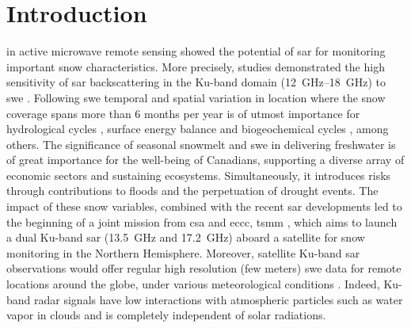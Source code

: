 \section{Introduction}

 in active microwave remote sensing showed the potential of \ac{sar} for monitoring important snow characteristics.
More precisely, studies demonstrated the high sensitivity of \ac{sar} backscattering in the Ku-band domain (\qtyrange{12}{18}{\giga\hertz}) to \acf{swe} \parencite{Shi2016,King2018,Rutter2019}.
Following \ac{swe} temporal and spatial variation in location where the snow coverage spans more than 6 months per year is of utmost importance for hydrological cycles \parencite{Zhang2005,Ayguen2020}, surface energy balance \parencite{Cohen2001,Box2019} and biogeochemical cycles \parencite{Zhang2005,Grogan2006}, among others.
The significance of seasonal snowmelt and \ac{swe} in delivering freshwater is of great importance for the well-being of Canadians, supporting a diverse array of economic sectors and sustaining ecosystems.
Simultaneously, it introduces risks through contributions to floods and the perpetuation of drought events.
The impact of these snow variables, combined with the recent \ac{sar} developments led to the beginning of a joint mission from \ac{csa} and \ac{eccc}, \acf{tsmm} \parencite{Derksen2019,Garnaud2019}, which aims to launch a dual Ku-band \ac{sar} (\qty{13.5}{\giga\hertz} and \qty{17.2}{\giga\hertz}) aboard a satellite for snow monitoring in the Northern Hemisphere.
Moreover, satellite Ku-band \ac{sar} observations would offer regular high resolution (few meters) \ac{swe} data for remote locations around the globe, under various meteorological conditions \parencite{Tsai2019}.
Indeed, Ku-band radar signals have low interactions with atmospheric particles such as water vapor in clouds and is completely independent of solar radiations.

